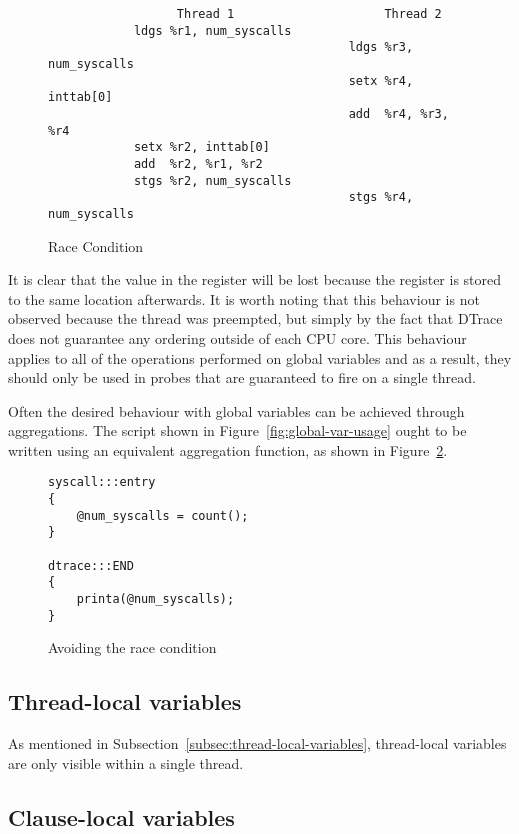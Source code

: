 \begin{figure}
  \begin{lstlisting}
                  Thread 1                     Thread 2
            ldgs %r1, num_syscalls
                                          ldgs %r3, num_syscalls
                                          setx %r4, inttab[0]
                                          add  %r4, %r3, %r4
            setx %r2, inttab[0]
            add  %r2, %r1, %r2
            stgs %r2, num_syscalls
                                          stgs %r4, num_syscalls
  \end{lstlisting}
  \caption{Race Condition}
  \label{fig:race}
\end{figure}

\noindent
It is clear that the value in the  register will be lost because
the register  is stored to the same location afterwards. It is
worth noting that this behaviour is not observed because the thread was
preempted, but simply by the fact that DTrace does not guarantee any ordering
outside of each CPU core. This behaviour applies to all of the operations
performed on global variables and as a result, they should only be used in
probes that are guaranteed to fire on a single thread. \newline

\noindent
Often the desired behaviour with global variables can be achieved through
aggregations. The script shown in Figure~\ref{fig:global-var-usage} ought to be
written using an equivalent aggregation function, as shown in
Figure~\ref{fig:avoiding-the-race}.

\begin{figure}
  \begin{lstlisting}
syscall:::entry
{
    @num_syscalls = count();
}

dtrace:::END
{
    printa(@num_syscalls);
}
  \end{lstlisting}
  \caption{Avoiding the race condition}
  \label{fig:avoiding-the-race}
\end{figure}

\subsection{Thread-local variables}

As mentioned in Subsection~\ref{subsec:thread-local-variables}, thread-local
variables are only visible within a single thread.

\subsection{Clause-local variables}

